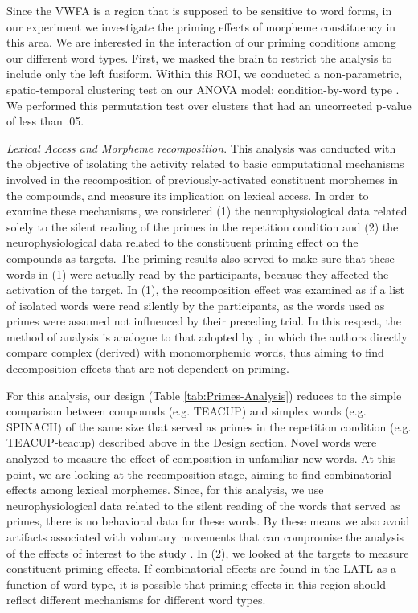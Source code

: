 \documentclass{frontiersSCNS}
\begin{document}
Since the VWFA is a region that is supposed to be sensitive to word forms, in our experiment we investigate the priming effects of morpheme constituency in this area. We are interested in the interaction of our priming conditions among our different word types. First, we masked the brain to restrict the analysis to include only the left fusiform. Within this ROI, we conducted a non-parametric, spatio-temporal clustering test on our ANOVA model: condition-by-word type \citep*{Maris:2007}. We performed this permutation test over clusters that had an uncorrected p-value of less than .05. 

\textit{Lexical Access and Morpheme recomposition}.  This analysis was conducted with the objective of isolating the activity related to basic computational mechanisms involved in the recomposition of previously-activated constituent morphemes in the compounds, and measure its implication on lexical access. In order to examine these mechanisms, we considered (1)  the neurophysiological data related solely to the silent reading of the primes in the repetition condition and (2) the neurophysiological data related to the constituent priming effect on the compounds as targets. The priming results also served to make sure that these words in (1) were actually read by the participants, because they affected the activation of the target.  In (1), the recomposition effect was examined as if a list of isolated words were read silently by the participants, as the words used as primes were assumed not influenced by their preceding trial. In this respect, the method of analysis is analogue to that adopted by \citet{Zweig:2009}, in which the authors directly compare complex (derived) with monomorphemic words, thus aiming to find decomposition effects that are not dependent on priming.  

For this analysis, our design (Table \ref{tab:Primes-Analysis}) reduces to the simple comparison between compounds (e.g. TEACUP) and simplex words (e.g. SPINACH) of the same size that served as primes in the repetition condition (e.g. TEACUP-teacup) described above in the Design section. Novel words were analyzed to measure the effect of composition in unfamiliar new words. At this point, we are looking at the recomposition stage, aiming to find combinatorial effects among lexical morphemes.   Since, for this analysis, we use neurophysiological data related to the silent reading of the words that served as primes, there is no behavioral data for these words.  By these means we also avoid artifacts associated with voluntary movements that can compromise the analysis of the effects of interest to the study \citep*{Hansen:2010}. In (2), we looked at the targets to measure constituent priming effects.  If combinatorial effects are found in the LATL as a function of word type, it is possible that priming effects in this region should reflect different mechanisms for different word types.
 
\end{document}
